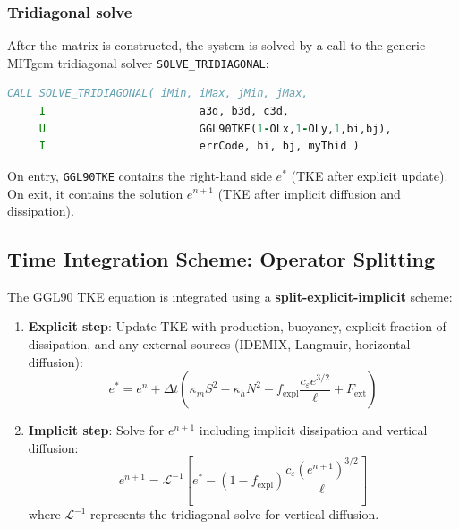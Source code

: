 \documentclass[12pt,letterpaper]{article}
\begin{document}
\subsubsection{Tridiagonal solve}

After the matrix is constructed, the system is solved by a call to the generic MITgcm tridiagonal solver \verb|SOLVE_TRIDIAGONAL|:

\begin{lstlisting}[language=Fortran,caption={(ggl90\_calc.F:L900--903) Solve tridiagonal system for TKE}]
      CALL SOLVE_TRIDIAGONAL( iMin, iMax, jMin, jMax,
     I                        a3d, b3d, c3d,
     U                        GGL90TKE(1-OLx,1-OLy,1,bi,bj),
     I                        errCode, bi, bj, myThid )
\end{lstlisting}

On entry, \verb|GGL90TKE| contains the right-hand side $e^*$ (TKE after explicit update). On exit, it contains the solution $e^{n+1}$ (TKE after implicit diffusion and dissipation).

\subsection{Time Integration Scheme: Operator Splitting}
\label{sec:tke_time_integration}

The GGL90 TKE equation is integrated using a \textbf{split-explicit-implicit} scheme:

\begin{enumerate}
\item \textbf{Explicit step}: Update TKE with production, buoyancy, explicit fraction of dissipation, and any external sources (IDEMIX, Langmuir, horizontal diffusion):
\begin{equation}
e^* = e^n + \Delta t \left( \kappa_m S^2 - \kappa_h N^2 - f_{\text{expl}} \frac{c_\varepsilon e^{3/2}}{\ell} + F_{\text{ext}} \right)
\end{equation}

\item \textbf{Implicit step}: Solve for $e^{n+1}$ including implicit dissipation and vertical diffusion:
\begin{equation}
e^{n+1} = \mathcal{L}^{-1} \left[ e^* - (1 - f_{\text{expl}}) \frac{c_\varepsilon (e^{n+1})^{3/2}}{\ell} \right]
\end{equation}
where $\mathcal{L}^{-1}$ represents the tridiagonal solve for vertical diffusion.
\end{enumerate}
\end{document}
